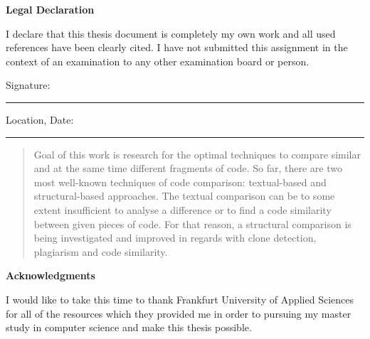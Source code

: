 \documentclass{report}
\begin{document}
\onehalfspacing
\null\vfil
\begin{center}{\huge\bf Legal Declaration\par}\end{center}
\null
I declare that this thesis document is completely my own work and all used references have been clearly cited. I have not submitted this assignment in the context of an examination to any other examination board or person.\\[2.5cm]

\begin{flushleft}
Signature:\\
\rule[1em]{25em}{0.5pt} %
 
Location, Date:\\
\rule[1em]{25em}{0.5pt} %
\end{flushleft}


\newpage
\pagestyle{fancy}
\fancyhead{}
\renewcommand{\headrulewidth}{0pt}
\renewcommand{\footrulewidth}{0.4pt}
\begin{abstract}

Goal of this work is research for the optimal techniques to compare similar and at the same time different fragments of code. So far, there are two most well-known techniques of code comparison: textual-based and structural-based approaches. The textual comparison can be to some extent insufficient to analyse a difference or to find a code similarity between given pieces of code. For that reason, a structural comparison is being investigated and improved in regards with clone detection, plagiarism and code similarity.

\end{abstract}

\newpage
\begin{center}{\huge\bf Acknowledgments\par}\end{center}
\null
I would like to take this time to thank Frankfurt University of Applied Sciences for all of the resources which they provided me in order to pursuing my master study in computer science and make this thesis possible.\vspace{5 mm}
\end{document}
